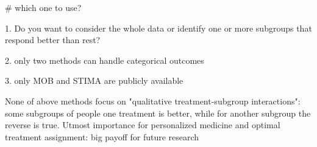 \documentclass[10pt]{article}
\begin{document}
# which one to use?

1. Do you want to consider the whole data or identify one or more subgroups that respond better than rest?

2. only two methods can handle categorical outcomes

3. only MOB and STIMA are publicly available



None of above methods focus on "qualitative treatment-subgroup interactions": some subgroups of people one treatment is better, while for another subgroup the reverse is true. Utmost importance for personalized medicine and optimal treatment assignment: big payoff for future research
\end{document}
